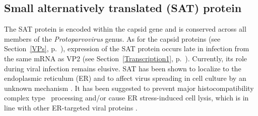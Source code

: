 

\subsection{Small alternatively translated (SAT) protein}
\label{SAT}
The SAT protein is encoded within the capsid gene and is conserved across all members of the \textit{Protoparvovirus} genus.  As for the capsid proteins (see Section~\ref{VPs}, p.~\pageref{VPs}), expression of the SAT protein occurs late in infection from the same mRNA as VP2 (see Section~\ref{Transcription1}, p.~\pageref{Transcription1}). Currently, its role during viral infection remains elusive. SAT has been shown to localize to the endoplasmic reticulum (ER) and to affect virus spreading in cell culture by an unknown mechanism \cite{pmid16189014}. It has been suggested to prevent major histocompatibility complex type~ processing \cite{pmid14671122, pmid14738766} and/or cause ER stress-induced cell lysis, which is in line with other ER-targeted viral proteins \cite{pmid14610184, pmid15708603, pmid11932381, pmid14960590}.
  



